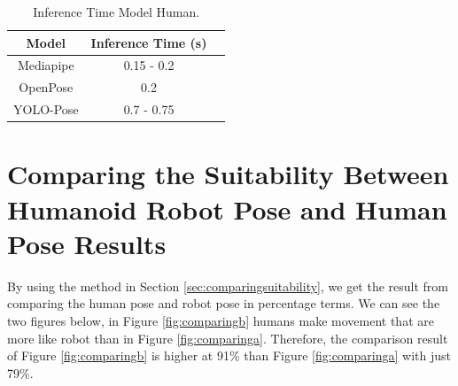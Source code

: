 \def\arraystretch{1.5}
\begin{longtable}{|c|c|c|}
  \caption{Inference Time Model Human.}
  \label{tb:inferencehuman}\\
  \hline
  \rowcolor[HTML]{C0C0C0}
  \textbf{Model}    & \textbf{Inference Time (s)} \\
  \hline
  Mediapipe   & 0.15 - 0.2\\
  \hline
  OpenPose    & 0.2\\
  \hline
  YOLO-Pose   & 0.7 - 0.75\\
  \hline
\end{longtable}

\section{Comparing the Suitability Between Humanoid Robot Pose and Human Pose Results}
\label{sec:comparingsuitabilityresults}

By using the method in Section \ref{sec:comparingsuitability}, we get the result from comparing the human pose and robot pose in percentage terms.
We can see the two figures below, in Figure \ref{fig:comparingb} humans make movement that are more like robot than in Figure \ref{fig:comparinga}.
Therefore, the comparison result of Figure \ref{fig:comparingb} is higher at 91\% than Figure \ref{fig:comparinga} with just 79\%.

